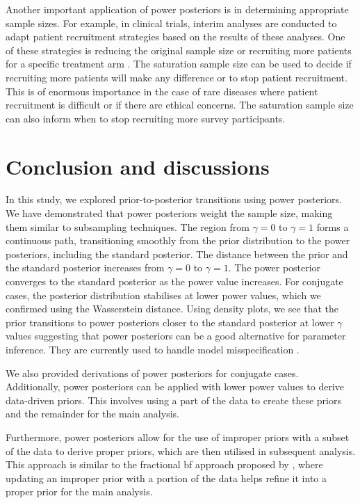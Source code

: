 \documentclass[12pt]{article}
\begin{document}
Another important application of power posteriors is in determining appropriate sample sizes. For example, in clinical trials, interim analyses are conducted to adapt patient recruitment strategies based on the results of these analyses. One of these strategies is reducing the original sample size or recruiting more patients for a specific treatment arm \cite{Berry2006, Ryan2022}. The saturation sample size can be used to decide if recruiting more patients will make any difference or to stop patient recruitment. This is of enormous importance in the case of rare diseases where patient recruitment is difficult or if there are ethical concerns. The saturation sample size can also inform when to stop recruiting more survey participants.




\FloatBarrier
\section{Conclusion and discussions}
In this study, we explored prior-to-posterior transitions using power posteriors. We have demonstrated that power posteriors weight the sample size, making them similar to subsampling techniques.  The region from $\gamma =0$ to $\gamma =1$ forms a continuous path, transitioning smoothly from the prior distribution to the power posteriors, including the standard posterior. The distance between the prior and the standard posterior increases from $\gamma =0$ to $\gamma =1$. 
The power posterior converges to the standard posterior as the power value increases. For conjugate cases, the posterior distribution stabilises at lower power values, which we confirmed using the Wasserstein distance. Using density plots, we see that the prior transitions to power posteriors closer to the standard posterior at lower $\gamma$ values suggesting that power posteriors can be a good alternative for parameter inference. They are currently used to handle model misspecification \citep{Jeffrey_2019}.

We also provided derivations of power posteriors for conjugate cases.  Additionally, power posteriors can be applied with lower power values to derive data-driven priors. This involves using a part of the data to create these priors and the remainder for the main analysis.

Furthermore, power posteriors allow for the use of improper priors with a subset of the data to derive proper priors, which are then utilised in subsequent analysis. This approach is similar to the fractional \gls{bf} approach proposed by \cite{ohaganPropertiesIntrinsicFractional1997}, where updating an improper prior with a portion of the data helps refine it into a proper prior for the main analysis.
\end{document}
